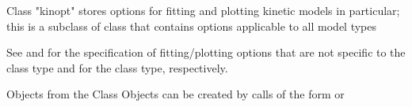 \documentclass{article}
\begin{document}
\begin{Description}\relax
Class "kinopt" stores options for fitting and plotting kinetic
models in particular; this is a subclass of class  that contains 
options applicable to all model types
\end{Description}
\begin{Details}\relax
See  and   for 
the specification of fitting/plotting options that are not specific to the 
class type and for the  class type, respectively.
\end{Details}
\begin{Section}{Objects from the Class}
Objects can be created by calls of the form  or
\end{Section}
\end{document}
